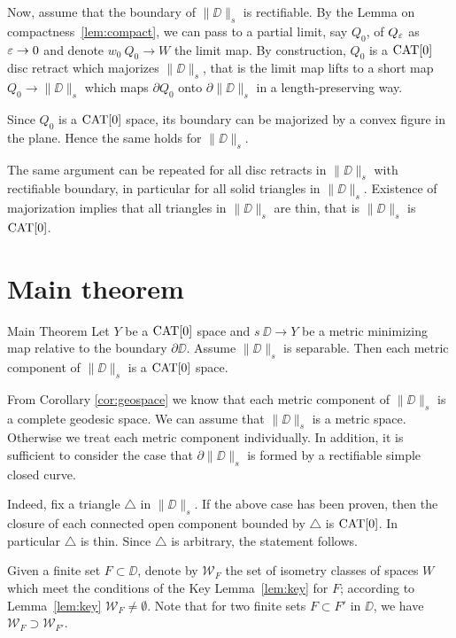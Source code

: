 \documentclass[a4paper,10pt]{amsart}
\begin{document}
Now, assume that the boundary of $\|\DD\|_s$ is rectifiable.
By the Lemma on compactness~\ref{lem:compact},
we can pass to a partial limit, say $Q_0$, of $Q_\varepsilon$ as $\varepsilon\to 0$ and denote $w_0\:Q_0\to W$ the limit map.
By construction, $Q_0$ is a $\mathop{\rm CAT}\nolimits[0]$ disc retract which majorizes $\|\DD\|_s$,
that is the limit map lifts to a short map $Q_0\to \|\DD\|_s$ which maps $\partial Q_0$ onto  $\partial \|\DD\|_s$ in a length-preserving way.

Since $Q_0$ is a $\mathop{\rm CAT}\nolimits[0]$ space, its boundary can be majorized by a convex figure in the plane.
Hence the same holds for $\|\DD\|_s$.

The same argument can be repeated for all disc retracts in $\|\DD\|_s$ with rectifiable boundary, in particular for all solid triangles in $\|\DD\|_s$.
Existence of majorization implies that all triangles in $\|\DD\|_s$ are thin, that is $\|\DD\|_s$ is $\mathop{\rm CAT}\nolimits[0]$.
\qeds

\section{Main theorem}

\begin{thm}{Main Theorem}\label{thm:main}
Let $Y$ be a $\mathop{\rm CAT}\nolimits[0]$ space 
and $s\:\DD\to Y$ be a metric minimizing map relative to the boundary $\partial\DD$.
Assume $\|\DD\|_s$  is separable. 
Then each metric component of $\|\DD\|_s$ is a $\mathop{\rm CAT}\nolimits[0]$ space. 
\end{thm}

From Corollary \ref{cor:geospace} we know that each metric component of $\|\DD\|_s$ is a complete geodesic space.
We can assume that $\|\DD\|_s$ is a metric space. Otherwise we treat each metric component 
individually.
In addition, it is sufficient to consider
the case that $\partial \|\DD\|_s$ is formed by a rectifiable simple closed curve.

Indeed, fix a triangle $\triangle$ in $\|\DD\|_s$. 
If the above case has been proven, 
then the closure of each connected open component bounded by $\triangle$ is $\mathop{\rm CAT}\nolimits[0]$.
In particular $\triangle$ is thin.
Since $\triangle$ is arbitrary, the statement follows.


Given a finite set $F\subset \DD$,
denote by $\mathcal{W}_F$
the set of isometry classes of spaces $W$ which meet the conditions of the Key Lemma~\ref{lem:key}
for $F$;
according to Lemma~\ref{lem:key} $\mathcal{W}_F\ne\emptyset$.
Note that for two finite sets $F\subset F'$ in $\DD$,
we have $\mathcal{W}_F\supset \mathcal{W}_{F'}$.
\end{document}
